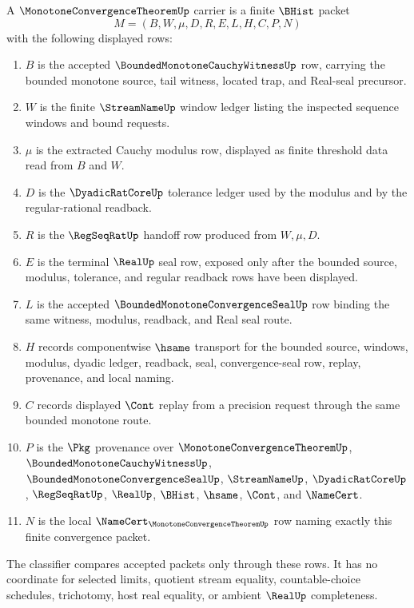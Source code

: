 \begin{definition}
\label{def:monotone-convergence-theorem-carrier}
A $\MonotoneConvergenceTheoremUp$ carrier is a finite $\BHist$ packet
$$
M=(B,W,\mu,D,R,E,L,H,C,P,N)
$$
with the following displayed rows:
\begin{enumerate}
\item $B$ is the accepted $\BoundedMonotoneCauchyWitnessUp$ row, carrying the bounded monotone source, tail witness, located trap, and Real-seal precursor.
\item $W$ is the finite $\StreamNameUp$ window ledger listing the inspected sequence windows and bound requests.
\item $\mu$ is the extracted Cauchy modulus row, displayed as finite threshold data read from $B$ and $W$.
\item $D$ is the $\DyadicRatCoreUp$ tolerance ledger used by the modulus and by the regular-rational readback.
\item $R$ is the $\RegSeqRatUp$ handoff row produced from $W,\mu,D$.
\item $E$ is the terminal $\RealUp$ seal row, exposed only after the bounded source, modulus, tolerance, and regular readback rows have been displayed.
\item $L$ is the accepted $\BoundedMonotoneConvergenceSealUp$ row binding the same witness, modulus, readback, and Real seal route.
\item $H$ records componentwise $\hsame$ transport for the bounded source, windows, modulus, dyadic ledger, readback, seal, convergence-seal row, replay, provenance, and local naming.
\item $C$ records displayed $\Cont$ replay from a precision request through the same bounded monotone route.
\item $P$ is the $\Pkg$ provenance over $\MonotoneConvergenceTheoremUp$, $\BoundedMonotoneCauchyWitnessUp$, $\BoundedMonotoneConvergenceSealUp$, $\StreamNameUp$, $\DyadicRatCoreUp$, $\RegSeqRatUp$, $\RealUp$, $\BHist$, $\hsame$, $\Cont$, and $\NameCert$.
\item $N$ is the local $\NameCert_{\MonotoneConvergenceTheoremUp}$ row naming exactly this finite convergence packet.
\end{enumerate}
The classifier compares accepted packets only through these rows. It has no coordinate for selected limits, quotient stream equality, countable-choice schedules, trichotomy, host real equality, or ambient $\RealUp$ completeness.
\end{definition}

